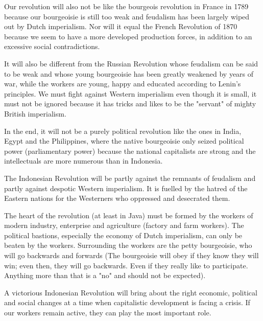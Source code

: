 Our revolution will also not be like the bourgeois revolution in France in 1789 because our bourgeoisie is still too 
weak and feudalism has been largely wiped out by Dutch imperialism. Nor will it equal the French Revolution of 1870 
because we seem to have a more developed production forces, in addition to an excessive social contradictions.\nline

It will also be different from the Russian Revolution whose feudalism can be said to be weak and whose young bourgeoisie 
has been greatly weakened by years of war, while the workers are young, happy and educated according to Lenin's principles. 
We must fight against Western imperialism even though it is small, it must not be ignored because it has tricks and likes 
to be the "servant" of mighty British imperialism.\nline

In the end, it will not be a purely political revolution like the ones in India, Egypt and the Philippines, where the 
native bourgeoisie only seized political power (parliamentary power) because the national capitalists are strong and the 
intellectuals are more numerous than in Indonesia.\nline

The Indonesian Revolution will be partly against the remnants of feudalism and partly against despotic Western imperialism. 
It is fuelled by the hatred of the Eastern nations for the Westerners who oppressed and desecrated them.\nline

The heart of the revolution (at least in Java) must be formed by the workers of modern industry, enterprise and agriculture 
(factory and farm workers). The political bastions, especially the economy of Dutch imperialism, can only be beaten by the workers. 
Surrounding the workers are the petty bourgeoisie, who will go backwards and forwards (The bourgeoisie will obey if they know they 
will win; even then, they will go backwards. Even if they really like to participate. Anything more than that is a "no" and should 
not be expected).\nline

A victorious Indonesian Revolution will bring about the right economic, political and social changes at a time when capitalistic 
development is facing a crisis. If our workers remain active, they can play the most important role.\nline